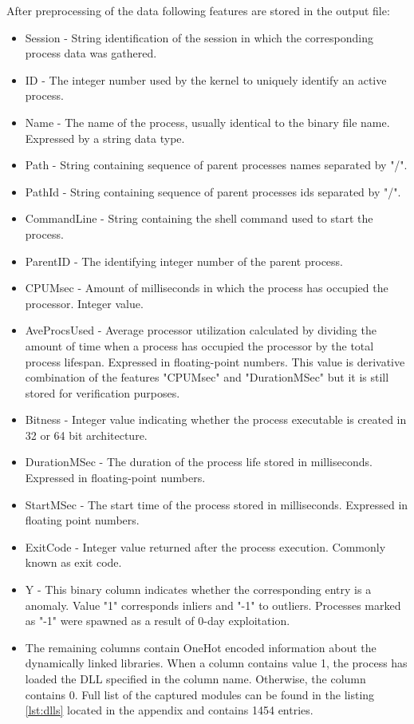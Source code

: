 \documentclass[a4paper,twoside,12pt]{book}
\begin{document}
After preprocessing of the data following features are stored in the output file:
\begin{itemize}
	\item Session - String identification of the session in which the corresponding process data 
	was gathered.
	\item ID -  The integer number used by the kernel to uniquely identify an active process.
	\item Name -  The name of the process, usually identical to the binary file name. Expressed by a 
	string data type.
	\item Path - String containing sequence of parent processes names separated by "/".
	\item PathId - String containing sequence of parent processes ids separated by "/".
	\item CommandLine - String containing the shell command used to start the process.
	\item ParentID - The identifying integer number of the parent process. 
	\item CPUMsec - Amount of milliseconds in which the process has occupied the processor. Integer value.
	\item AveProcsUsed -  Average processor utilization calculated by dividing the amount of time 
	when a process has occupied the processor by the total process lifespan. Expressed in floating-point 
	numbers. This value is derivative combination of the features "CPUMsec" and "DurationMSec"
	but it is still stored for verification purposes.
	\item Bitness - Integer value indicating whether the process executable is created in 
	32 or 64 bit architecture.
	\item DurationMSec - The duration of the process life stored in milliseconds. Expressed in 
	floating-point numbers.
	\item StartMSec -  The start time of the process stored in milliseconds. Expressed in floating 
	point numbers.
	\item ExitCode - Integer value returned after the process execution. Commonly known as exit code.
	\item Y - This binary column indicates whether the corresponding entry is a anomaly. Value "1" corresponds
	inliers and "-1" to outliers. Processes marked as "-1" were spawned as a result of 0-day exploitation.
	\item The remaining columns contain OneHot encoded information about the dynamically linked 
	libraries. When a column contains value 1, the process has loaded the DLL specified in the 
	column name. Otherwise, the column contains 0. Full list of the captured modules can be 
	found in the listing \ref{lst:dlls} located in the appendix and contains 1454 entries.
\end{itemize}
\end{document}
